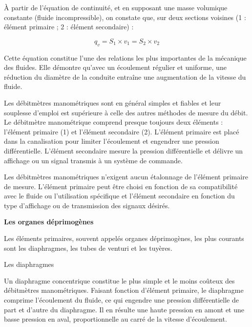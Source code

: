 À partir de l’équation de continuité, et en supposant une masse volumique constante (fluide incompressible), on constate que, sur deux sections voisines (1 : élément primaire ; 2 : élément secondaire) :


\[ q_{v} = S_{1} \times v_{1} = S_{2} \times v_{2} \]


Cette équation constitue l’une des relations les plus importantes de la mécanique des fluides. Elle démontre qu’avec un écoulement régulier et uniforme, une réduction du diamètre de la conduite entraîne une augmentation de la vitesse du fluide. 
\vspace{0.3cm}

Les débitmètres manométriques sont en général simples et fiables et leur souplesse d’emploi est supérieure à celle des autres méthodes de mesure du débit. Le débitmètre manométrique comprend presque toujours deux éléments : l’élément primaire (1) et l’élément secondaire (2).
L’élément primaire est placé dans la canalisation pour limiter l’écoulement et engendrer une pression différentielle. L’élément secondaire mesure la pression différentielle et délivre un affichage ou un signal transmis à un système de commande. 
\vspace{0.3cm}


Les débitmètres manométriques n’exigent aucun étalonnage de l’élément primaire de mesure. L’élément primaire peut être choisi en fonction de sa compatibilité avec le fluide ou l’utilisation spécifique et l’élément secondaire en fonction du type d’affichage ou de transmission des signaux désirés.


\vspace{0.3cm}
\textbf{Les organes déprimogènes}
\vspace{0.3cm}

Les éléments primaires, souvent appelés organes déprimogènes, les plus courants sont les diaphragmes, les tubes de venturi et les tuyères.


\vspace{0.3cm}
Les diaphragmes
\vspace{0.3cm}

Un diaphragme concentrique constitue le plus simple et le moins coûteux des débitmètres manométriques. Faisant fonction d’élément primaire, le diaphragme comprime l’écoulement du fluide, ce qui engendre une pression différentielle de part et d’autre du diaphragme. Il en résulte une haute pression en amont et une basse pression en aval, proportionnelle au carré de la vitesse d’écoulement. 
\vspace{0.3cm}

